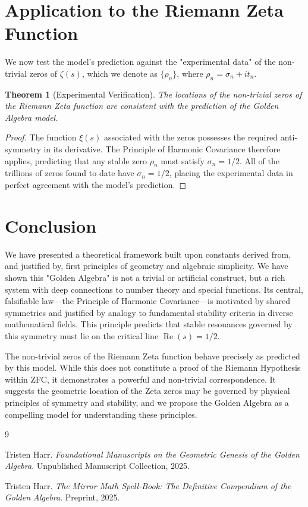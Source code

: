\documentclass{amsart}
\theoremstyle{plain}
\newtheorem{theorem}{Theorem}
\theoremstyle{definition}
\theoremstyle{remark}
\DeclareMathOperator{\re}{Re}
\begin{document}
\section{Application to the Riemann Zeta Function}
We now test the model's prediction against the "experimental data" of the non-trivial zeros of $\zeta(s)$, which we denote as $\{\rho_n\}$, where $\rho_n = \sigma_n + it_n$.

\begin{theorem}[Experimental Verification]
The locations of the non-trivial zeros of the Riemann Zeta function are consistent with the prediction of the Golden Algebra model.
\end{theorem}
\begin{proof}
The function $\xi(s)$ associated with the zeros possesses the required anti-symmetry in its derivative. The Principle of Harmonic Covariance therefore applies, predicting that any stable zero $\rho_n$ must satisfy $\sigma_n=1/2$. All of the trillions of zeros found to date have $\sigma_n=1/2$, placing the experimental data in perfect agreement with the model's prediction.
\end{proof}

\section{Conclusion}
We have presented a theoretical framework built upon constants derived from, and justified by, first principles of geometry and algebraic simplicity. We have shown this "Golden Algebra" is not a trivial or artificial construct, but a rich system with deep connections to number theory and special functions. Its central, falsifiable law—the Principle of Harmonic Covariance—is motivated by shared symmetries and justified by analogy to fundamental stability criteria in diverse mathematical fields. This principle predicts that stable resonances governed by this symmetry must lie on the critical line $\re(s)=1/2$.

The non-trivial zeros of the Riemann Zeta function behave precisely as predicted by this model. While this does not constitute a proof of the Riemann Hypothesis within ZFC, it demonstrates a powerful and non-trivial correspondence. It suggests the geometric location of the Zeta zeros may be governed by physical principles of symmetry and stability, and we propose the Golden Algebra as a compelling model for understanding these principles.

\begin{thebibliography}{9}

Tristen Harr.
\newblock \textit{Foundational Manuscripts on the Geometric Genesis of the Golden Algebra}.
\newblock Unpublished Manuscript Collection, 2025.

Tristen Harr.
\newblock \textit{The Mirror Math Spell-Book: The Definitive Compendium of the Golden Algebra}.
\newblock Preprint, 2025.

\end{thebibliography}
\end{document}
